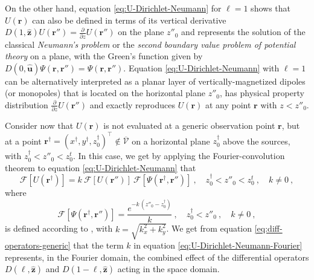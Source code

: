 On the other hand, equation \ref{eq:U-Dirichlet-Neumann} for $\ell = 1$ shows that $U(\mathbf{r})$ can also
be defined in terms of its vertical derivative 
$D(1, \hat{\mathbf{z}}) U(\mathbf{r}'') = \tfrac{\partial}{\partial z} U(\mathbf{r}'')$ 
on the plane $z''_{0}$ and represents the solution of the classical \textit{Neumann’s problem} or the 
\textit{second boundary value problem of potential theory} \cite[][ p. 246]{kellogg1967} on a plane, 
with the Green's function given by $D(0, \hat{\mathbf{u}}) \Psi(\mathbf{r}, \mathbf{r}'') = \Psi(\mathbf{r}, \mathbf{r}'')$.
Equation \ref{eq:U-Dirichlet-Neumann} with $\ell = 1$ can be alternatively interpreted as a planar layer of
vertically-magnetized dipoles (or monopoles) that is located on the horizontal plane $z''_{0}$, has 
physical property distribution $\tfrac{\partial}{\partial z} U(\mathbf{r}'')$ and exactly reproduces 
$U(\mathbf{r})$ at any point $\mathbf{r}$ with $z < z''_{0}$.

Consider now that $U(\mathbf{r})$ is not evaluated at a generic observation point $\mathbf{r}$, but at a point 
$\mathbf{r}^{\dagger} = (x^{\dagger}, y^{\dagger}, z^{\dagger}_{0})^{\top} \notin \overline{\mathcal{V}}$ 
on a horizontal plane $z^{\dagger}_{0}$ above the sources, with $z^{\dagger}_{0} < z''_{0} < z^{t}_{0}$.
In this case, we get by applying the Fourier-convolution theorem 
\cite[][ p. 268]{blakely1996} to equation \ref{eq:U-Dirichlet-Neumann} that
\begin{equation}
	\mathcal{F} [ U(\mathbf{r}^{\dagger}) ] = 
	k \: \mathcal{F} [ U(\mathbf{r}'') ] \:
	\mathcal{F} [ \Psi(\mathbf{r}^{\dagger}, \mathbf{r}'') ] \: ,
	\quad z^{\dagger}_{0} < z''_{0} < z^{t}_{0} \: , \quad k \ne 0 \: ,
	\label{eq:U-Dirichlet-Neumann-Fourier}
\end{equation}
where 
\begin{equation}
	\mathcal{F} [ \Psi(\mathbf{r}^{\dagger}, \mathbf{r}'') ] 
	= \frac{e^{- k \, (z''_{0} - z^{\dagger}_{0})}}{k}
	\: , \quad z^{\dagger}_{0} < z''_{0} \: , \quad k \ne 0 \: ,
	\label{eq:Psi-Fourier}
\end{equation}
is defined according to \citet[][ p. 275]{blakely1996}, with $k = \sqrt{k_{x}^{2} + k_{y}^{2}}$.
We get from equation \ref{eq:diff-operators-generic} that the term $k$ in equation \ref{eq:U-Dirichlet-Neumann-Fourier} represents,
in the Fourier domain, the combined effect of the differential operators $D(\ell, \hat{\mathbf{z}})$ and $D(1-\ell, \hat{\mathbf{z}})$ 
acting in the space domain.